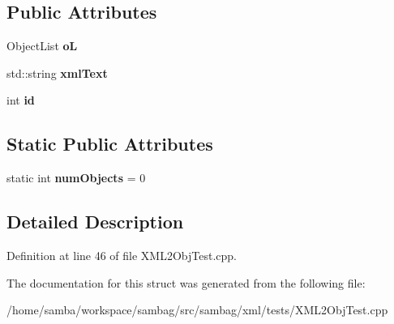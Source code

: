 \subsection*{Public Attributes}
\begin{DoxyCompactItemize}
\item 
\hypertarget{struct_base_object_aaeb58511262f4868b73198c20199d4b9}{
ObjectList {\bfseries oL}}
\label{struct_base_object_aaeb58511262f4868b73198c20199d4b9}

\item 
\hypertarget{struct_base_object_a00f7f647ca9a0583d2b11fc9fb278540}{
std::string {\bfseries xmlText}}
\label{struct_base_object_a00f7f647ca9a0583d2b11fc9fb278540}

\item 
\hypertarget{struct_base_object_ab21889ef86ffc1849898d2613ccdc75f}{
int {\bfseries id}}
\label{struct_base_object_ab21889ef86ffc1849898d2613ccdc75f}

\end{DoxyCompactItemize}
\subsection*{Static Public Attributes}
\begin{DoxyCompactItemize}
\item 
\hypertarget{struct_base_object_a82e3c8af21d913af997dda53a2e9c0af}{
static int {\bfseries numObjects} = 0}
\label{struct_base_object_a82e3c8af21d913af997dda53a2e9c0af}

\end{DoxyCompactItemize}


\subsection{Detailed Description}


Definition at line 46 of file XML2ObjTest.cpp.



The documentation for this struct was generated from the following file:\begin{DoxyCompactItemize}
\item 
/home/samba/workspace/sambag/src/sambag/xml/tests/XML2ObjTest.cpp\end{DoxyCompactItemize}

